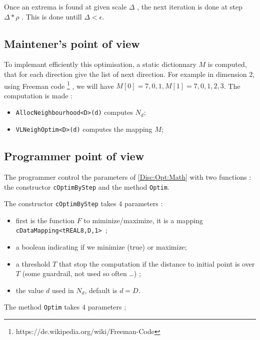 Once an extrema is found at given scale $\Delta$ , the next iteration is done
at step $\Delta * \rho$ . This is done untill $\Delta < \epsilon$.


\subsection{Maintener's point of view}

To implemant efficiently this optimisation,  a static dictionnary  $M$ is computed, that for
each direction give the list of next direction. For example in dimension $2$, using Freeman
code \footnote{https://de.wikipedia.org/wiki/Freeman-Code} , we will have $M[0]= {7,0,1} , M[1]={7,0,1,2,3}$.
The computation is made :

\begin{itemize}
   \item  {\tt AllocNeighbourhood<D>(d)} computes  $N_d$;
   \item  {\tt VLNeighOptim<D>(d)} computes the mapping $M$;
\end{itemize}



\subsection{Programmer point of view}

The programmer control the parameters of \ref{Disc:Opt:Math} with two functions :
the constructor {\tt cOptimByStep}  and the method {\tt Optim}.

The constructor {\tt cOptimByStep}  takes $4$ parameters :

\begin{itemize}
   \item first is the function $F$  to miminize/maximize, it is a mapping {\tt cDataMapping<tREAL8,D,1> };
   \item a boolean indicating if we minimize (true) or maximize;
   \item a threshold $T$ that stop the computation if the distance to initial point is over $T$
         (some guardrail, not used so often \dots) ;
   \item the value $d$ used in $N_d$, default is $d=D$.
\end{itemize}

The method {\tt Optim} takes $4$ parameters ;

